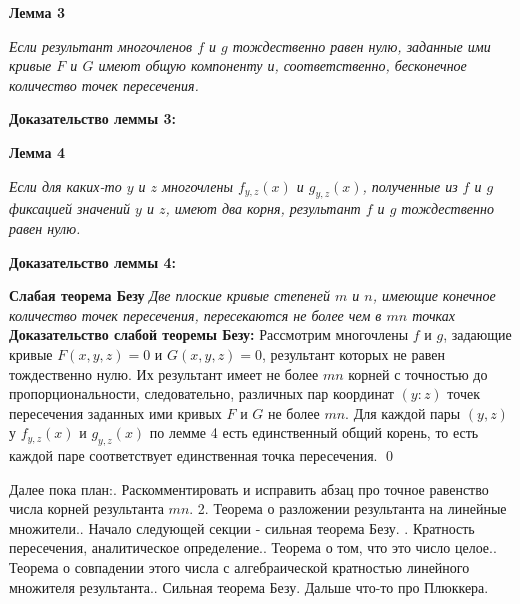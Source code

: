 \documentclass[a4paper, 12pt]{article}
\begin{document}
\smallskip
\textbf{Лемма 3}

\textit{Если результант многочленов $f$ и $g$ тождественно равен нулю, заданные ими кривые $F$ и $G$ имеют общую компоненту и, соответственно, бесконечное количество точек пересечения.} %

\textbf{Доказательство леммы 3:}\newline

\smallskip
\textbf{Лемма 4}

\textit{Если для каких-то $y$ и $z$ многочлены $f_{y,z}(x)$ и $g_{y,z}(x)$, полученные из $f$ и $g$ фиксацией значений $y$ и $z$, имеют два корня, результант $f$ и $g$ тождественно равен нулю.} %

\textbf{Доказательство леммы 4:}\newline

\bigskip
\textbf{Слабая теорема Безу}
\textit{Две плоские кривые степеней $m$ и $n$, имеющие конечное количество точек пересечения, пересекаются не более чем в $mn$ точках}\newline
\smallskip
\textbf{Доказательство слабой теоремы Безу:}\newline
Рассмотрим многочлены $f$ и $g$, задающие кривые $F(x,y,z) = 0$ и $G(x,y,z) = 0$, результант которых не равен тождественно нулю. Их результант имеет не более $mn$ корней с точностью до пропорциональности, следовательно, различных пар координат $(y:z)$ точек пересечения заданных ими кривых $F$ и $G$ не более $mn$. Для каждой пары $(y,z)$ у $f_{y,z}(x)$ и $g_{y,z}(x)$ по лемме 4 есть единственный общий корень, то есть каждой паре соответствует единственная точка пересечения. \qed\newline

\bigskip
Далее пока план:. Раскомментировать и исправить абзац про точное равенство числа корней результанта $mn$.
2. Теорема о разложении результанта на линейные множители.. Начало следующей секции - сильная теорема Безу. . Кратность пересечения, аналитическое определение.. Теорема о том, что это число целое.. Теорема о совпадении этого числа с алгебраической кратностью линейного множителя результанта.. Сильная теорема Безу. Дальше что-то про Плюккера.\newline
\end{document}
